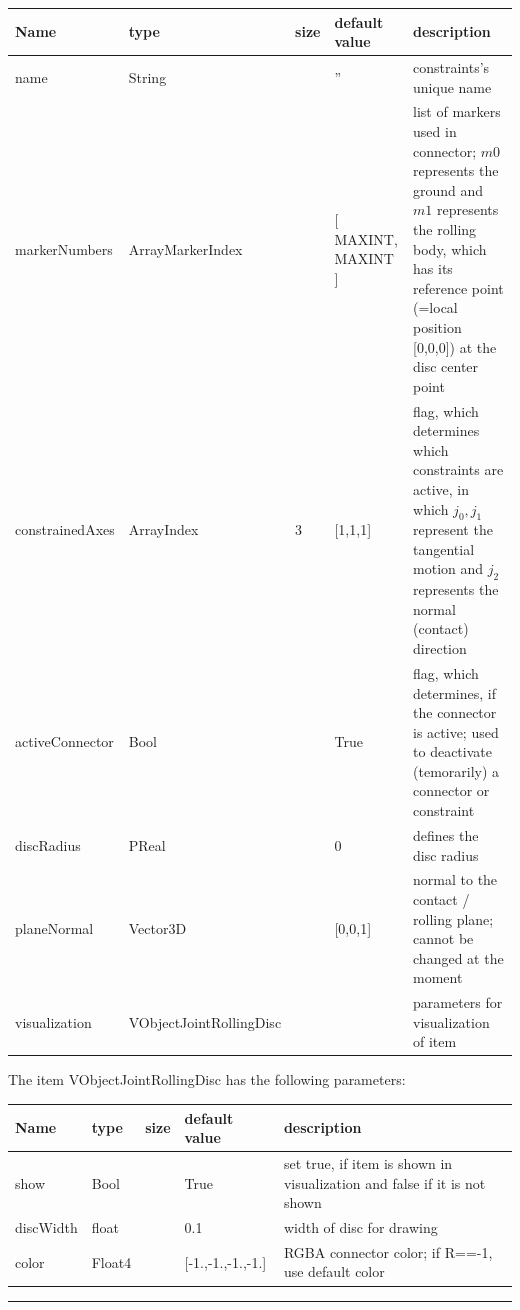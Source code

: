 \begin{center}
  \footnotesize
  \begin{longtable}{| p{4.5cm} | p{2.5cm} | p{0.5cm} | p{2.5cm} | p{6cm} |}
    \hline
    \bf Name & \bf type & \bf size & \bf default value & \bf description \\ \hline
    name &     String &      &     '' &     constraints's unique name\\ \hline
    markerNumbers &     ArrayMarkerIndex &     \tabnewline 2 &     [ MAXINT, MAXINT ] &     list of markers used in connector; $m0$ represents the ground and $m1$ represents the rolling body, which has its reference point (=local position [0,0,0]) at the disc center point\\ \hline
    constrainedAxes &     ArrayIndex &     3 &     [1,1,1] &     flag, which determines which constraints are active, in which $j_0,j_1$ represent the tangential motion and $j_2$ represents the normal (contact) direction\\ \hline
    activeConnector &     Bool &      &     True &     flag, which determines, if the connector is active; used to deactivate (temorarily) a connector or constraint\\ \hline
    discRadius &     PReal &      &     0 &     defines the disc radius\\ \hline
    planeNormal &     Vector3D &      &     [0,0,1] &     normal to the contact / rolling plane; cannot be changed at the moment\\ \hline
    visualization & VObjectJointRollingDisc & & & parameters for visualization of item \\ \hline
	  \end{longtable}
	\end{center}
The item VObjectJointRollingDisc has the following parameters:\vspace{-1cm}\\ 
\begin{center}
  \footnotesize
  \begin{longtable}{| p{4.5cm} | p{2.5cm} | p{0.5cm} | p{2.5cm} | p{6cm} |}
    \hline
    \bf Name & \bf type & \bf size & \bf default value & \bf description \\ \hline
    show &     Bool &      &     True &     set true, if item is shown in visualization and false if it is not shown\\ \hline
    discWidth &     float &      &     0.1 &     width of disc for drawing\\ \hline
    color &     Float4 &      &     [-1.,-1.,-1.,-1.] &     RGBA connector color; if R==-1, use default color\\ \hline
	  \end{longtable}
	\end{center}
\par\noindent\rule{\textwidth}{0.4pt}
\label{description_ObjectJointRollingDisc}
